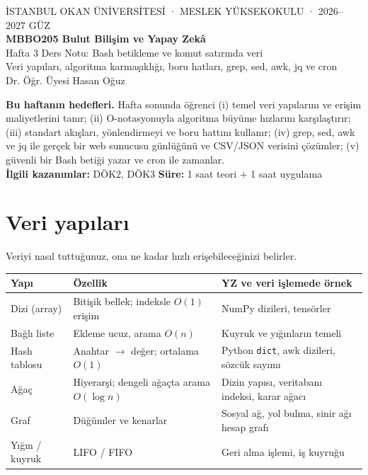 \documentclass[11pt,a4paper]{article}
\begin{document}
\begin{tcolorbox}[colback=lacivert,colframe=lacivert,arc=2mm,left=5mm,right=5mm,top=4mm,bottom=4mm]
\color{white}\sffamily
{\small İSTANBUL OKAN ÜNİVERSİTESİ · MESLEK YÜKSEKOKULU · 2026–2027 GÜZ}\\[3mm]
{\LARGE\bfseries MBBO205 Bulut Bilişim ve Yapay Zekâ}\\[1mm]
{\large Hafta 3 Ders Notu: Bash betikleme ve komut satırında veri}\\[1mm]
{\small Veri yapıları, algoritma karmaşıklığı, boru hatları, grep, sed, awk, jq ve cron}\\[3mm]
{\small Dr. Öğr. Üyesi Hasan Oğuz}
\end{tcolorbox}

\begin{kutu}
\textbf{Bu haftanın hedefleri.} Hafta sonunda öğrenci (i) temel veri yapılarını ve erişim maliyetlerini tanır; (ii) O-notasyonuyla algoritma büyüme hızlarını karşılaştırır; (iii) standart akışları, yönlendirmeyi ve boru hattını kullanır; (iv) grep, sed, awk ve jq ile gerçek bir web sunucusu günlüğünü ve CSV/JSON verisini çözümler; (v) güvenli bir Bash betiği yazar ve cron ile zamanlar. \\[1mm]
\textbf{İlgili kazanımlar:} DÖK2, DÖK3 \quad \textbf{Süre:} 1 saat teori + 1 saat uygulama
\end{kutu}

\tableofcontents

\section{Veri yapıları}
Veriyi nasıl tuttuğunuz, ona ne kadar hızlı erişebileceğinizi belirler.
\begin{center}
\begin{tabularx}{\textwidth}{@{}l Y Y@{}}
\toprule
\textbf{Yapı} & \textbf{Özellik} & \textbf{YZ ve veri işlemede örnek} \\
\midrule
Dizi (array) & Bitişik bellek; indeksle $O(1)$ erişim & NumPy dizileri, tensörler \\
Bağlı liste & Ekleme ucuz, arama $O(n)$ & Kuyruk ve yığınların temeli \\
Hash tablosu & Anahtar $\to$ değer; ortalama $O(1)$ & Python \texttt{dict}, awk dizileri, sözcük sayımı \\
Ağaç & Hiyerarşi; dengeli ağaçta arama $O(\log n)$ & Dizin yapısı, veritabanı indeksi, karar ağacı \\
Graf & Düğümler ve kenarlar & Sosyal ağ, yol bulma, sinir ağı hesap grafı \\
Yığın / kuyruk & LIFO / FIFO & Geri alma işlemi, iş kuyruğu \\
\bottomrule
\end{tabularx}
\end{center}
\end{document}
